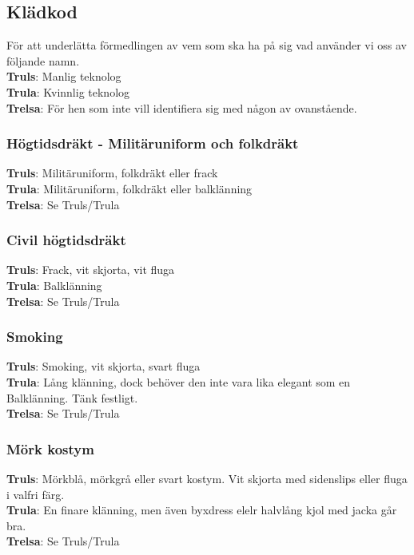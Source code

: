 \subsection*{Klädkod}
För att underlätta förmedlingen av vem som ska ha på sig vad använder vi oss av följande namn.\\

\textbf{Truls}: Manlig teknolog\\
\textbf{Trula}: Kvinnlig teknolog\\
\textbf{Trelsa}: För hen som inte vill identifiera sig med någon av ovanstående.

\subsubsection*{Högtidsdräkt - Militäruniform och folkdräkt}

\textbf{Truls}: Militäruniform, folkdräkt eller frack\\
\textbf{Trula}: Militäruniform, folkdräkt eller balklänning\\
\textbf{Trelsa}: Se Truls/Trula

\subsubsection*{Civil högtidsdräkt}

\textbf{Truls}: Frack, vit skjorta, vit fluga\\
\textbf{Trula}: Balklänning\\
\textbf{Trelsa}: Se Truls/Trula

\subsubsection*{Smoking}
\textbf{Truls}: Smoking, vit skjorta, svart fluga\\
\textbf{Trula}: Lång klänning, dock behöver den inte vara lika elegant som en Balklänning. Tänk festligt.\\
\textbf{Trelsa}: Se Truls/Trula

\subsubsection*{Mörk kostym}
\textbf{Truls}: Mörkblå, mörkgrå eller svart kostym. Vit skjorta med sidenslips eller fluga i valfri färg.\\
\textbf{Trula}: En finare klänning, men även byxdress elelr halvlång kjol med jacka går bra.\\
\textbf{Trelsa}: Se Truls/Trula

